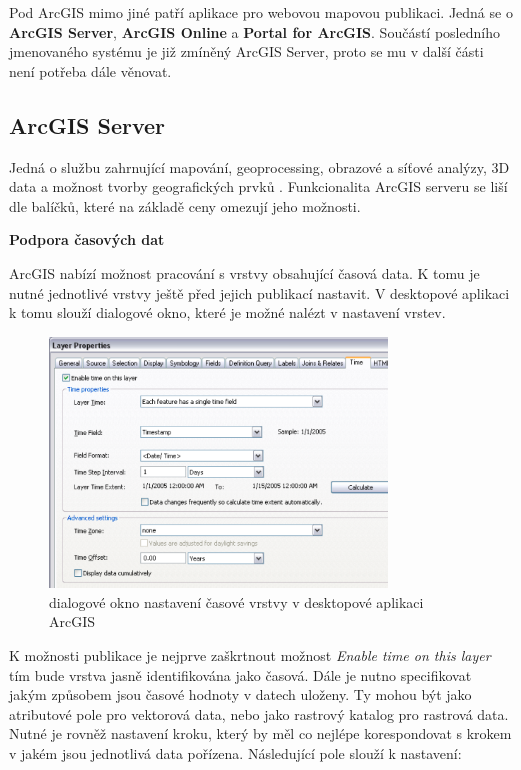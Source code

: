 Pod ArcGIS mimo jiné patří aplikace pro webovou mapovou
publikaci. Jedná se o \textbf{ArcGIS Server}, \textbf{ArcGIS Online} a
\textbf{Portal for ArcGIS}. Součástí posledního jmenovaného systému je
již zmíněný ArcGIS Server, proto se mu v další části není potřeba dále
věnovat.

\newpage
\subsection{ArcGIS Server}

Jedná o službu zahrnující mapování, geoprocessing, obrazové a síťové
analýzy, 3D data a možnost tvorby geografických prvků
\cite{arcgis-publishing-service}. Funkcionalita ArcGIS serveru se liší
dle balíčků, které na základě ceny omezují jeho možnosti.

\bigskip
\noindent \textbf{Podpora časových dat}
 
ArcGIS nabízí možnost pracování s vrstvy obsahující časová data. K
tomu je nutné jednotlivé vrstvy ještě před jejich publikací
nastavit. V desktopové aplikaci k tomu slouží dialogové okno, které je
možné nalézt v nastavení vrstev.

\begin{figure}[h!]  \centering
\includegraphics[width=0.8\textwidth]{../img/arcgis-layer-edit.png}
	\caption{dialogové okno nastavení časové vrstvy v desktopové
aplikaci ArcGIS}
	\label{fig:arcgis-time-settings}
\end{figure}

K možnosti publikace je nejprve zaškrtnout možnost \textit{Enable time
on this layer} tím bude vrstva jasně identifikována jako časová. Dále
je nutno specifikovat jakým způsobem jsou časové hodnoty v datech
uloženy. Ty mohou být jako atributové pole pro vektorová data, nebo
jako rastrový katalog pro rastrová data. Nutné je rovněž nastavení
kroku, který by měl co nejlépe korespondovat s krokem v jakém jsou
jednotlivá data pořízena. Následující pole slouží k nastavení:

